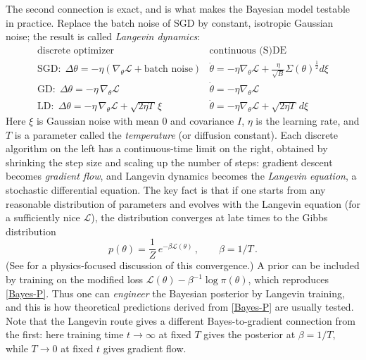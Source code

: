 \documentclass[11pt]{article}
\newcommand{\CL}{{\mathcal L}}
\begin{document}
The second connection is exact, and is what makes the Bayesian model testable in practice. Replace the batch noise of SGD by constant, isotropic Gaussian noise; the result is called \emph{Langevin dynamics}:
%
\begin{equation} \label{training-options}
    \begin{array}{l|l}
    \text{discrete optimizer} & \text{continuous (S)DE} \\\hline
    \text{SGD}:\; \Delta\theta = -\eta(\nabla_\theta \CL+ \text{batch noise}) &  \dot\theta = -\eta\nabla_\theta \CL+ \frac{\eta}{\sqrt{B}} \Sigma(\theta)^{\frac{1}{2}} d\xi\\
    \text{GD}:\; \Delta\theta=-\eta\,\nabla_\theta \CL  & \dot\theta = -\eta\nabla_\theta \CL \\
    \text{LD}:\;\Delta\theta = -\eta\,\nabla_\theta \CL + \sqrt{2\eta T}\, \xi & \dot\theta = -\eta\nabla_\theta \CL + \sqrt{2\eta T}\,d\xi
    \end{array}
\end{equation}
%
Here $\xi$ is Gaussian noise with mean $0$ and covariance $I$, $\eta$ is the learning rate, and $T$ is a parameter called the \emph{temperature} (or diffusion constant). Each discrete algorithm on the left has a continuous-time limit on the right, obtained by shrinking the step size and scaling up the number of steps: gradient descent becomes \emph{gradient flow}, and Langevin dynamics becomes the \emph{Langevin equation}, a stochastic differential equation. The key fact is that if one starts from any reasonable distribution of parameters and evolves with the Langevin equation (for a sufficiently nice $\CL$), the distribution converges at late times to the Gibbs distribution
%
\begin{equation} \label{pure-Gibbs}
    p(\theta) = \frac{1}{Z}\,e^{-\beta\CL(\theta)}\,,\qquad \beta = 1/T\,.
\end{equation}
%
(See \cite[Chapter 3]{TongKineticTheory} for a physics-focused discussion of this convergence.) A prior can be included by training on the modified loss $\CL(\theta) - \beta^{-1}\log\pi(\theta)$, which reproduces \eqref{Bayes-P}. Thus one can \emph{engineer} the Bayesian posterior by Langevin training, and this is how theoretical predictions derived from \eqref{Bayes-P} are usually tested. Note that the Langevin route gives a different Bayes-to-gradient connection from the first: here training time $t\to\infty$ at fixed $T$ gives the posterior at $\beta = 1/T$, while $T\to 0$ at fixed $t$ gives gradient flow.
\end{document}
